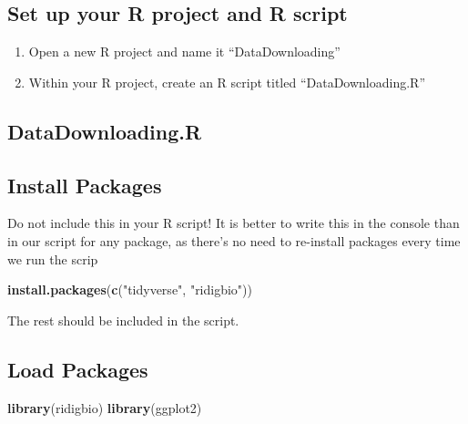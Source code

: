 \documentclass[
]{book}
\newenvironment{Shaded}{\begin{snugshade}}{\end{snugshade}}
\newcommand{\KeywordTok}[1]{\textcolor[rgb]{0.13,0.29,0.53}{\textbf{#1}}}
\newcommand{\NormalTok}[1]{#1}
\newcommand{\StringTok}[1]{\textcolor[rgb]{0.31,0.60,0.02}{#1}}
\providecommand{\tightlist}{%
  \setlength{\itemsep}{0pt}\setlength{\parskip}{0pt}}
\begin{document}
\hypertarget{set-up-your-r-project-and-r-script}{%
\subsection*{Set up your R project and R script}\label{set-up-your-r-project-and-r-script}}

\begin{enumerate}
\def\labelenumi{\arabic{enumi}.}
\tightlist
\item
  Open a new R project and name it ``DataDownloading''
\item
  Within your R project, create an R script titled ``DataDownloading.R''
\end{enumerate}

\hypertarget{datadownloading.r}{%
\subsection*{DataDownloading.R}\label{datadownloading.r}}

\hypertarget{install-packages}{%
\subsection*{Install Packages}\label{install-packages}}

Do not include this in your R script! It is better to write this in the console than in our script for any package, as there's no need to re-install packages every time we run the scrip

\begin{Shaded}
\begin{Highlighting}[]
\KeywordTok{install.packages}\NormalTok{(}\KeywordTok{c}\NormalTok{(}\StringTok{"tidyverse"}\NormalTok{, }\StringTok{"ridigbio"}\NormalTok{))}
\end{Highlighting}
\end{Shaded}

The rest should be included in the script.

\hypertarget{load-packages}{%
\subsection*{Load Packages}\label{load-packages}}

\begin{Shaded}
\begin{Highlighting}[]
\KeywordTok{library}\NormalTok{(ridigbio)}
\KeywordTok{library}\NormalTok{(ggplot2)}
\end{Highlighting}
\end{Shaded}
\end{document}
